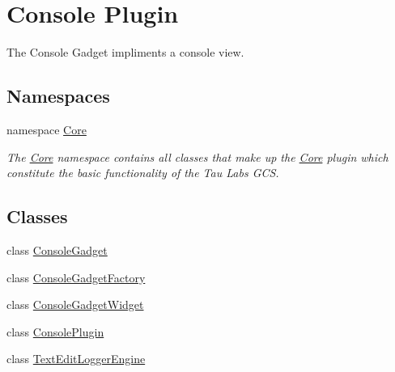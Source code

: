 \hypertarget{group___console_plugin}{\section{Console Plugin}
\label{group___console_plugin}
}


The Console Gadget impliments a console view.  


\subsection*{Namespaces}
\begin{DoxyCompactItemize}
\item 
namespace \hyperlink{namespace_core}{Core}
\begin{DoxyCompactList}\small\item\em The \hyperlink{namespace_core}{Core} namespace contains all classes that make up the \hyperlink{namespace_core}{Core} plugin which constitute the basic functionality of the Tau Labs G\-C\-S. \end{DoxyCompactList}\end{DoxyCompactItemize}
\subsection*{Classes}
\begin{DoxyCompactItemize}
\item 
class \hyperlink{class_console_gadget}{Console\-Gadget}
\item 
class \hyperlink{class_console_gadget_factory}{Console\-Gadget\-Factory}
\item 
class \hyperlink{class_console_gadget_widget}{Console\-Gadget\-Widget}
\item 
class \hyperlink{class_console_plugin}{Console\-Plugin}
\item 
class \hyperlink{class_text_edit_logger_engine}{Text\-Edit\-Logger\-Engine}
\end{DoxyCompactItemize}
